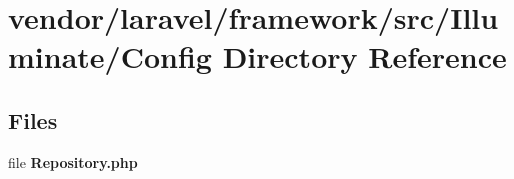 \section{vendor/laravel/framework/src/\+Illuminate/\+Config Directory Reference}
\label{dir_afd7311eb84c31990fdfbff828ddc777}
\subsection*{Files}
\begin{DoxyCompactItemize}
\item 
file {\bf Repository.\+php}
\end{DoxyCompactItemize}
